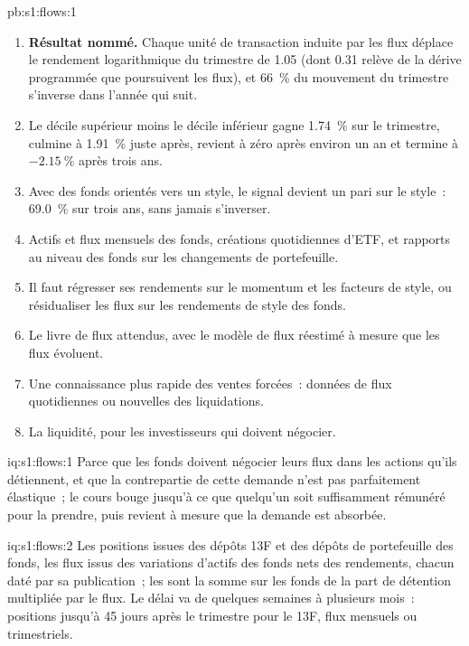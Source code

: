 \begin{solution}{pb:s1:flows:1}
\begin{enumerate}
\item \textbf{Résultat nommé.} Chaque unité de transaction induite par les flux déplace le rendement logarithmique du trimestre de 1.05 (dont 0.31 relève de la dérive programmée que poursuivent les flux), et 66~\%
du mouvement du trimestre s'inverse dans l'année qui suit.
\item Le décile supérieur moins le décile inférieur gagne 1.74~\% sur le trimestre, culmine à 1.91~\% juste après, revient à zéro après environ un an et termine à $-2.15~\%$ après
trois ans.
\item Avec des fonds orientés vers un style, le signal devient un pari sur le style~: 69.0~\% sur trois ans, sans jamais s'inverser.
\item Actifs et flux mensuels des fonds, créations quotidiennes d'ETF, et rapports au niveau des fonds sur les changements de portefeuille.
\item Il faut régresser ses rendements sur le momentum et les facteurs de style, ou résidualiser les flux sur les rendements de style des fonds.
\item Le livre de flux attendus, avec le modèle de flux réestimé à mesure que les flux évoluent.
\item Une connaissance plus rapide des ventes forcées~: données de flux quotidiennes ou nouvelles des liquidations.
\item La liquidité, pour les investisseurs qui doivent négocier.
\end{enumerate}
\end{solution}

\begin{solution}{iq:s1:flows:1}
Parce que les fonds doivent négocier leurs flux dans les actions qu'ils détiennent, et que la contrepartie de cette demande n'est pas parfaitement élastique~; le cours bouge jusqu'à ce que quelqu'un soit
suffisamment rémunéré pour la prendre, puis revient à mesure que la demande est absorbée.
\end{solution}

\begin{solution}{iq:s1:flows:2}
Les positions issues des dépôts 13F et des dépôts de portefeuille des fonds, les flux issus des variations d'actifs des fonds nets des rendements, chacun daté par sa publication~; les  sont la somme sur
les fonds de la part de détention multipliée par le flux. Le délai va de quelques semaines à plusieurs mois~: positions jusqu'à 45 jours après le trimestre pour le 13F, flux mensuels ou trimestriels.
\end{solution}

